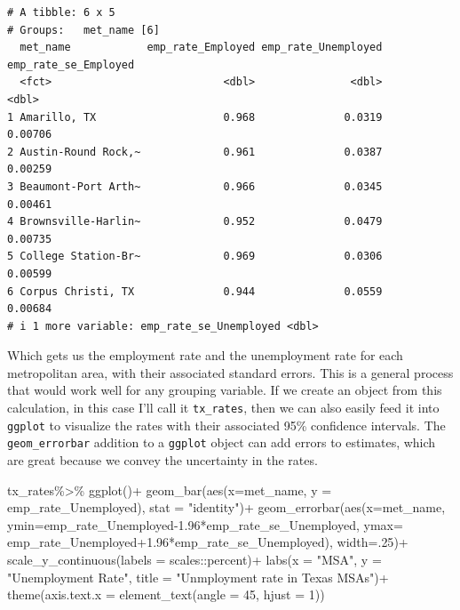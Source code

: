 \documentclass[
  letterpaper,
  DIV=11,
  numbers=noendperiod]{scrreprt}
\newenvironment{Shaded}{\begin{snugshade}}{\end{snugshade}}
\newcommand{\AttributeTok}[1]{\textcolor[rgb]{0.40,0.45,0.13}{#1}}
\newcommand{\DecValTok}[1]{\textcolor[rgb]{0.68,0.00,0.00}{#1}}
\newcommand{\FloatTok}[1]{\textcolor[rgb]{0.68,0.00,0.00}{#1}}
\newcommand{\FunctionTok}[1]{\textcolor[rgb]{0.28,0.35,0.67}{#1}}
\newcommand{\NormalTok}[1]{\textcolor[rgb]{0.00,0.23,0.31}{#1}}
\newcommand{\SpecialCharTok}[1]{\textcolor[rgb]{0.37,0.37,0.37}{#1}}
\newcommand{\StringTok}[1]{\textcolor[rgb]{0.13,0.47,0.30}{#1}}
\begin{document}
\begin{verbatim}
# A tibble: 6 x 5
# Groups:   met_name [6]
  met_name            emp_rate_Employed emp_rate_Unemployed emp_rate_se_Employed
  <fct>                           <dbl>               <dbl>                <dbl>
1 Amarillo, TX                    0.968              0.0319              0.00706
2 Austin-Round Rock,~             0.961              0.0387              0.00259
3 Beaumont-Port Arth~             0.966              0.0345              0.00461
4 Brownsville-Harlin~             0.952              0.0479              0.00735
5 College Station-Br~             0.969              0.0306              0.00599
6 Corpus Christi, TX              0.944              0.0559              0.00684
# i 1 more variable: emp_rate_se_Unemployed <dbl>
\end{verbatim}

Which gets us the employment rate and the unemployment rate for each
metropolitan area, with their associated standard errors. This is a
general process that would work well for any grouping variable. If we
create an object from this calculation, in this case I'll call it
\texttt{tx\_rates}, then we can also easily feed it into \texttt{ggplot}
to visualize the rates with their associated 95\% confidence intervals.
The \texttt{geom\_errorbar} addition to a \texttt{ggplot} object can add
errors to estimates, which are great because we convey the uncertainty
in the rates.

\begin{Shaded}
\begin{Highlighting}[]
\NormalTok{tx\_rates}\SpecialCharTok{\%\textgreater{}\%}
  \FunctionTok{ggplot}\NormalTok{()}\SpecialCharTok{+}
  \FunctionTok{geom\_bar}\NormalTok{(}\FunctionTok{aes}\NormalTok{(}\AttributeTok{x=}\NormalTok{met\_name, }\AttributeTok{y =}\NormalTok{ emp\_rate\_Unemployed), }\AttributeTok{stat =} \StringTok{"identity"}\NormalTok{)}\SpecialCharTok{+}
  \FunctionTok{geom\_errorbar}\NormalTok{(}\FunctionTok{aes}\NormalTok{(}\AttributeTok{x=}\NormalTok{met\_name,}
                    \AttributeTok{ymin=}\NormalTok{emp\_rate\_Unemployed}\FloatTok{{-}1.96}\SpecialCharTok{*}\NormalTok{emp\_rate\_se\_Unemployed,}
                    \AttributeTok{ymax=}\NormalTok{ emp\_rate\_Unemployed}\FloatTok{+1.96}\SpecialCharTok{*}\NormalTok{emp\_rate\_se\_Unemployed),}
                \AttributeTok{width=}\NormalTok{.}\DecValTok{25}\NormalTok{)}\SpecialCharTok{+}
  \FunctionTok{scale\_y\_continuous}\NormalTok{(}\AttributeTok{labels =}\NormalTok{ scales}\SpecialCharTok{::}\NormalTok{percent)}\SpecialCharTok{+}
  \FunctionTok{labs}\NormalTok{(}\AttributeTok{x =} \StringTok{"MSA"}\NormalTok{, }
       \AttributeTok{y =} \StringTok{"Unemployment Rate"}\NormalTok{,}
       \AttributeTok{title =} \StringTok{"Unmployment rate in Texas MSAs"}\NormalTok{)}\SpecialCharTok{+}
  \FunctionTok{theme}\NormalTok{(}\AttributeTok{axis.text.x =} \FunctionTok{element\_text}\NormalTok{(}\AttributeTok{angle =} \DecValTok{45}\NormalTok{, }\AttributeTok{hjust =} \DecValTok{1}\NormalTok{))}
\end{Highlighting}
\end{Shaded}
\end{document}
